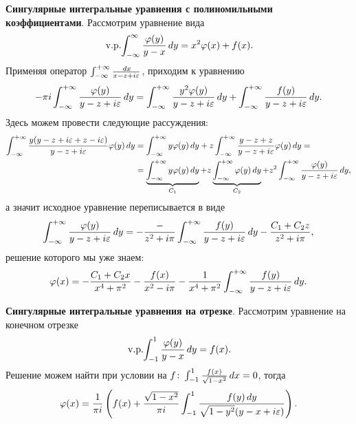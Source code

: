 \textbf{Сингулярные интегральные уравнения с полиномильными коэффициентами}. Рассмотрим уравнение вида
\begin{equation*}
	\,\textnormal{v.p.}\hspace{-2pt}\int_{-\infty}^{\infty} \frac{\varphi(y)}{y-x} \, d y 
	= x^2 \varphi(x) + f(x).
\end{equation*}
Применяя оператор $\int_{-\infty}^{+\infty} \frac{\, d x}{x - z + i \varepsilon}$, приходим к уравнению
\begin{equation*}
	-  \pi i \int_{-\infty}^{+\infty} \frac{\varphi(y)}{y-z +  i \varepsilon} \, d y = \int_{-\infty}^{+\infty} \frac{y^2 \varphi(y)}{y-z + i \varepsilon} \, d y +  \int_{-\infty}^{+\infty}  \frac{f(y)}{y-z + i \varepsilon} \, d y.
\end{equation*}
Здесь можем провести следующие рассуждения:
\begin{align*}
	\int_{-\infty}^{+\infty} \frac{y(y - z + i \varepsilon + z - i \varepsilon)}{y - z + i \varepsilon} \varphi(y) \, d y &= \int_{-\infty}^{+\infty} y \varphi(y) \, d y + z \int_{-\infty}^{+\infty} \frac{y - z + z}{y-z + i \varepsilon} \varphi(y) \, d y 
	= \\ &= 
	\underbrace{\int_{-\infty}^{+\infty} y \varphi(y) \, d y}_{C_1} + z \underbrace{\int_{-\infty}^{+\infty} \varphi(y) \, d y }_{C_2}+ z^2 \int_{-\infty}^{+\infty} \frac{\varphi(y)}{y-z + i \varepsilon} \, d y,
\end{align*}
а значит исходное уравнение переписывается в виде
\begin{equation*}
	\int_{-\infty}^{+\infty} \frac{\varphi(y)}{y-z + i \varepsilon} \, d y = - \frac{-}{z^2 + i \pi} \int_{-\infty}^{+\infty} \frac{f(y)}{y-z + i \varepsilon} \, d y - \frac{C_1 + C_2 z}{z^2 + i \pi},
\end{equation*}
решение которого мы уже знаем:
\begin{equation*}
	\varphi(x) = - \frac{C_1 + C_2 x}{x^4 + \pi^2} - \frac{f(x)}{x^2 - i \pi} - \frac{1}{x^4 + \pi^2} \int_{-\infty}^{+\infty} \frac{f(y)}{y-z + i \varepsilon} \, d y.
\end{equation*}

\textbf{Сингулярные интегральные уравнения на отрезке}. Рассмотрим  уравнение на конечном отрезке
\begin{equation*}
	\,\textnormal{v.p.}\hspace{-2pt}\int_{-1}^{1} \frac{\varphi(y)}{y-x} \, d y = f(x).
\end{equation*}
Решение можем найти при условии на $f\colon \int_{-1}^{1} \frac{f(x)}{\sqrt{1-x^2}} \, d x = 0$, тогда
\begin{equation*}
	\varphi(x) = \frac{1}{\pi i}\left(
		f(x) + \frac{\sqrt{1-x^2}}{\pi i} \int_{-1}^{1} \frac{f(y) \, d y}{\sqrt{1-y^2} (y-x+i \varepsilon)}
	\right).
\end{equation*}



\newpage